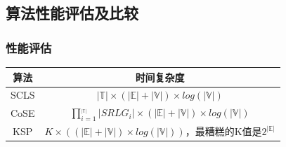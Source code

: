 \subsection{算法性能评估及比较}
\begin{frame}
\frametitle{性能评估}
\begin{tabular}{c|c}
  \toprule
  算法 & 时间复杂度 \\
  \midrule
  SCLS & $|\mathbb{T}|\times(|\mathbb{E}|+|\mathbb{V}|)\times log(|\mathbb{V}|)$ \\
  \hline
  CoSE & $\prod\limits_{i = 1}^{_{|\mathbb{T}|}} {\left| {SRL{G_i}} \right|}\times (|\mathbb{E}|+|\mathbb{V}|)\times log(|\mathbb{V}|)$ \\
  \hline
  KSP & $K\times ((|\mathbb{E}|+|\mathbb{V}|)\times log(|\mathbb{V}|))$，最糟糕的K值是$2^{|\mathbb{E}|}$ \\
  \bottomrule
\end{tabular}
\end{frame}


